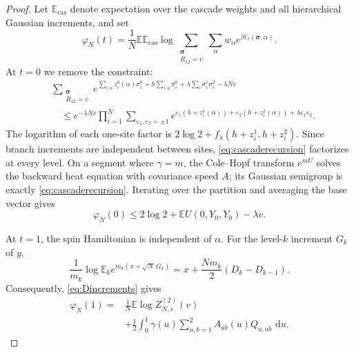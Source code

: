 \documentclass[11pt]{article}
\numberwithin{equation}{section}
\theoremstyle{plain}
\theoremstyle{definition}
\newcommand{\E}{\mathbb E}
\newcommand{\1}{\mathbf 1}
\newcommand{\dd}{\,\mathrm d}
\begin{document}
\begin{proof}
Let $\E_{\mathrm{cas}}$ denote expectation over the cascade weights
and all hierarchical Gaussian increments, and set
\begin{equation}
 \varphi_N(t)=\frac1N\E\E_{\mathrm{cas}}\log
 \sum_{\substack{\boldsymbol\sigma\\R_{12}=v}}
 \sum_\alpha w_\alpha e^{\mathcal H_t(\boldsymbol\sigma,\alpha)}.
 \label{eq:GTphi}
\end{equation}
At $t=0$ we remove the constraint:
\begin{align}
 &\sum_{\substack{\boldsymbol\sigma\\R_{12}=v}}
 e^{\sum_{i,a}z_i^a(\alpha)\sigma_i^a
 +h\sum_{i,a}\sigma_i^a
 +\lambda\sum_i\sigma_i^1\sigma_i^2-\lambda Nv}\nonumber\\
 &\quad\le e^{-\lambda Nv}
 \prod_{i=1}^N\sum_{\varepsilon_1,\varepsilon_2=\pm1}
 e^{\varepsilon_1(h+z_i^1(\alpha))
   +\varepsilon_2(h+z_i^2(\alpha))
   +\lambda\varepsilon_1\varepsilon_2}.
 \label{eq:GTremoveconstraint}
\end{align}
The logarithm of each one-site factor is
$2\log2+f_\lambda(h+z_i^1,h+z_i^2)$.  Since branch increments are
independent between sites, \eqref{eq:cascaderecursion} factorizes at
every level.  On a segment where $\gamma=m$, the Cole--Hopf transform
$e^{mU}$ solves the backward heat equation with covariance speed
$A$; its Gaussian semigroup is exactly
\eqref{eq:cascaderecursion}.  Iterating over the partition and
averaging the base vector gives
\begin{equation}
 \varphi_N(0)
 \le2\log2+\E U(0,Y_0,Y_0)-\lambda v.
 \label{eq:GTendpointzero}
\end{equation}

At $t=1$, the spin Hamiltonian is independent of $\alpha$.  For the
level-$k$ increment $G_k$ of $y$,
\[
 \frac1{m_k}\log\E_k
 e^{m_k(x+\sqrt N\,G_k)}
 =x+\frac{Nm_k}{2}(D_k-D_{k-1}).
\]
Consequently, \eqref{eq:Dincrements} gives
\begin{align}
 \varphi_N(1)
 ={}&\frac1N\E\log Z^{(2)}_{N,s}(v)\nonumber\\
 &+\frac12\int_0^1\gamma(u)
 \sum_{a,b=1}^2A_{ab}(u)Q_{u,ab}\,\dd u.
 \label{eq:GTendpointone}
\end{align}


\end{proof}
\end{document}
